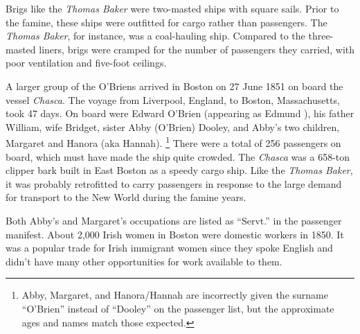 Brigs like the \textit{Thomas Baker} were two-masted ships with square sails.\cite{OHanlon:35} Prior to the famine, these ships were outfitted for cargo rather than passengers.\cite{Laxton:9} The \textit{Thomas Baker}, for instance, was a coal-hauling ship.\cite{MorningAdvertiser} Compared to the three-masted liners, brigs were cramped for the number of passengers they carried, with poor ventilation and five-foot ceilings.\cite{OHanlon:33} 

A larger group of the O'Briens arrived in Boston on 27 June 1851 on board the vessel \textit{Chasca}.\cite{Chascay:1} The voyage from Liverpool, England, to Boston, Massachusetts, took 47 days.\cite{Chascay2:1} On board were Edward O'Brien (appearing as Edmund%
), his father William, wife Bridget, sister Abby (O'Brien) Dooley, and Abby's two children, Margaret and Hanora (aka Hannah). %
\footnote{Abby, Margaret, and Hanora/Hannah are incorrectly given the surname ``O'Brien'' instead of ``Dooley'' on the passenger list, but the approximate ages and names match those expected.}
There were a total of 256 passengers on board,\cite{Chascay:2} which must have made the ship quite crowded. The \textit{Chasca} was a 658-ton clipper bark built in East Boston as a speedy cargo ship.\cite{ChascaCard} Like the \textit{Thomas Baker}, it was probably retrofitted to carry passengers in response to the large demand for transport to the New World during the famine years.

Both Abby's and Margaret's occupations are listed as ``Servt.'' in the passenger manifest.\cite{Chascay:4} About 2,000 Irish women in Boston were domestic workers in 1850. It was a popular trade for Irish immigrant women since they spoke English and didn't have many other opportunities for work available to them.\cite{Ryan:41}

